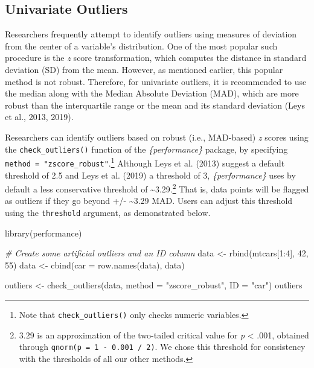 \documentclass{article}
\newenvironment{Shaded}{\begin{snugshade}}{\end{snugshade}}
\newcommand{\AttributeTok}[1]{\textcolor[rgb]{0.77,0.63,0.00}{#1}}
\newcommand{\CommentTok}[1]{\textcolor[rgb]{0.56,0.35,0.01}{\textit{#1}}}
\newcommand{\DecValTok}[1]{\textcolor[rgb]{0.00,0.00,0.81}{#1}}
\newcommand{\FunctionTok}[1]{\textcolor[rgb]{0.00,0.00,0.00}{#1}}
\newcommand{\NormalTok}[1]{#1}
\newcommand{\OtherTok}[1]{\textcolor[rgb]{0.56,0.35,0.01}{#1}}
\newcommand{\SpecialCharTok}[1]{\textcolor[rgb]{0.00,0.00,0.00}{#1}}
\newcommand{\StringTok}[1]{\textcolor[rgb]{0.31,0.60,0.02}{#1}}
\begin{document}
\hypertarget{univariate-outliers}{%
\subsection{Univariate Outliers}\label{univariate-outliers}}

Researchers frequently attempt to identify outliers using measures of
deviation from the center of a variable's distribution. One of the most
popular such procedure is the \emph{z} score transformation, which
computes the distance in standard deviation (SD) from the mean. However,
as mentioned earlier, this popular method is not robust. Therefore, for
univariate outliers, it is recommended to use the median along with the
Median Absolute Deviation (MAD), which are more robust than the
interquartile range or the mean and its standard deviation (Leys et al.,
2013, 2019).

Researchers can identify outliers based on robust (i.e., MAD-based)
\emph{z} scores using the \texttt{check\_outliers()} function of the
\emph{\{performance\}} package, by specifying
\texttt{method\ =\ "zscore\_robust"}.\footnote{Note that
  \texttt{check\_outliers()} only checks numeric variables.} Although
Leys et al. (2013) suggest a default threshold of 2.5 and Leys et al.
(2019) a threshold of 3, \emph{\{performance\}} uses by default a less
conservative threshold of \textasciitilde3.29.\footnote{3.29 is an
  approximation of the two-tailed critical value for \emph{p}
  \textless{} .001, obtained through
  \texttt{qnorm(p\ =\ 1\ -\ 0.001\ /\ 2)}. We chose this threshold for
  consistency with the thresholds of all our other methods.} That is,
data points will be flagged as outliers if they go beyond +/-
\textasciitilde3.29 MAD. Users can adjust this threshold using the
\texttt{threshold} argument, as demonstrated below.

\begin{Shaded}
\begin{Highlighting}[]
\FunctionTok{library}\NormalTok{(performance)}

\CommentTok{\# Create some artificial outliers and an ID column}
\NormalTok{data }\OtherTok{\textless{}{-}} \FunctionTok{rbind}\NormalTok{(mtcars[}\DecValTok{1}\SpecialCharTok{:}\DecValTok{4}\NormalTok{], }\DecValTok{42}\NormalTok{, }\DecValTok{55}\NormalTok{)}
\NormalTok{data }\OtherTok{\textless{}{-}} \FunctionTok{cbind}\NormalTok{(}\AttributeTok{car =} \FunctionTok{row.names}\NormalTok{(data), data)}

\NormalTok{outliers }\OtherTok{\textless{}{-}} \FunctionTok{check\_outliers}\NormalTok{(data, }\AttributeTok{method =} \StringTok{"zscore\_robust"}\NormalTok{, }\AttributeTok{ID =} \StringTok{"car"}\NormalTok{)}
\NormalTok{outliers}
\end{Highlighting}
\end{Shaded}
\end{document}
